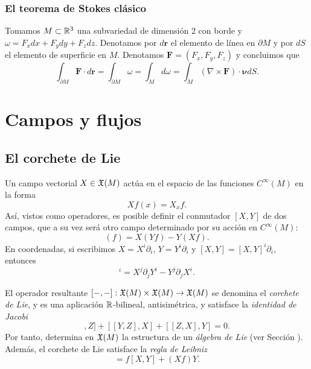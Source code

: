 \documentclass[11pt,a4paper]{amsbook}
\theoremstyle{remark} \newtheorem{rmk}[subsection]{Observación}
\theoremstyle{definition} \newtheorem{defn}[subsection]{Definición}
\theoremstyle{definition} \newtheorem{ex}[subsection]{Ejemplo}
\theoremstyle{definition} \newtheorem{ej}[subsection]{Ejercicio}
\begin{document}
\subsubsection{El teorema de Stokes clásico} Tomamos $M\subset \mathbb R^3$ una subvariedad de dimensión $2$ con borde y $\omega = F_x dx + F_y dy + F_z dz$. Denotamos por $d\bm{r}$ el elemento de línea en $\partial M$ y por $dS$ el elemento de superficie en $M$. Denotamos $\bm{F}=(F_x,F_y,F_z)$ y concluimos que
\begin{equation*}
\int_{\partial M} \bm{F} \cdot d\bm{r} = \int_{\partial M} \omega = \int_M d\omega = \int_M (\nabla \times \bm{F}) \cdot \bm{\nu} dS.
\end{equation*}

\section{Campos y flujos}

\subsection{El corchete de Lie}
Un campo vectorial $X\in \mathfrak X(M)$ actúa en el espacio de las funciones $C^\infty(M)$ en la forma
\begin{equation*}
X f (x) = X_x f.
\end{equation*}
Así, vistos como operadores, es posible definir el conmutador $[X,Y]$ de dos campos, que a su vez será otro campo determinado por su acción en $C^\infty(M)$:
\begin{equation*}
[X,Y](f) = X(Yf) - Y(Xf).
\end{equation*}
En coordenadas, si escribimos $X=X^i \partial_i$, $Y=Y^i\partial_i$ y $[X,Y]=[X,Y]^i \partial_i$, entonces
\begin{equation*}
[X,Y]^i = X^j\partial_j Y^i - Y^j\partial_j X^i.
\end{equation*}

El operador resultante $[-,-]: \mathfrak X(M) \times \mathfrak X(M)\rightarrow \mathfrak X(M)$ se denomina el \emph{corchete de Lie}, y es una aplicación $\mathbb R$-bilineal, antisimétrica, y satisface la \emph{identidad de Jacobi}
\begin{equation*}
[[X,Y],Z] + [[Y,Z],X] + [[Z,X], Y] = 0.
\end{equation*}
Por tanto, determina en $\mathfrak X(M)$ la estructura de un \emph{álgebra de Lie} (ver Sección ). Además, el corchete de Lie satisface la \emph{regla de Leibniz}
\begin{equation*}
[X,fY] = f[X,Y] + (Xf) Y.
\end{equation*}
\end{document}
